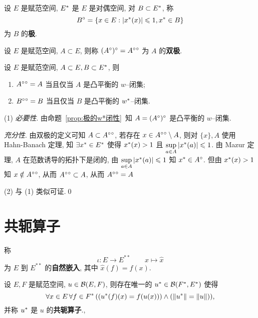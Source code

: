 	\begin{Definition}[对偶空间的极]\label{def:对偶空间的极}
		设 $ E $ 是赋范空间, $ E^{*} $ 是 $ E $ 是对偶空间, 对 $ B\subset E^{*} $, 称
		\[
			B^{\circ}=\{ x\in E:\left| x^{*}(x) \right| \leqslant1, x^{*}\in B \}
		\]
		为 $ B $ 的\textbf{极}.
	\end{Definition}
	\begin{Definition}[双极]\label{def:双极}
		设 $ E $ 是赋范空间, $ A\subset E $, 则称 $ (A^{\circ})^{\circ}=A^{\circ}{}^{\circ} $ 为 $ A $ 的\textbf{双极}.
	\end{Definition}

	\begin{Theorem}[双极定理]\label{thm:双极定理}

		设 $ E $ 是赋范空间, $ A\subset E, B\subset E^{*} $, 则
		\begin{enumerate}[(1)]
			\item $ A^{\circ}{}^{\circ}=A $ 当且仅当 $ A $ 是凸平衡的 $ w $--闭集;
			\item $ B^{\circ}{}^{\circ}=B $ 当且仅当 $ B $ 是凸平衡的 $ w^{*} $--闭集.
		\end{enumerate}
	\end{Theorem}
	\begin{Proof}
		(1) \textsl{必要性}. 由命题~\ref{prop:极的w*闭性}~知 $ A=(A^{\circ})^{\circ} $ 是凸平衡的 $ w $--闭集.

		\textsl{充分性}. 由双极的定义可知 $ A\subset A^{\circ}{}^{\circ} $, 若存在 $ x\in A^{\circ}{}^{\circ}\setminus A $, 则对 $ \{ x \}, A $ 使用 Hahn-Banach 定理, 知 $ \exists x^{*}\in E^{*} $ 使得 $ x^{*}(x)>1 $ 且 $ \sup\limits_{a\in A}\left| x^{*}(a) \right| \leqslant1 $. 由 Mazur 定理, $ A $ 在范数诱导的拓扑下是闭的, 由 $ \sup\limits_{a\in A}\left| x^{*}(a) \right| \leqslant1 $ 知 $ x^{*}\in A^{\circ} $. 但由 $ x^{*}(x)>1 $ 知 $ x\notin A^{\circ}{}^{\circ} $, 从而 $ A^{\circ}{}^{\circ}\subset A $, 从而 $ A^{\circ}{}^{\circ}= A $

		(2) 与 (1) 类似可证.\qed
	\end{Proof}
\section{共轭算子}
	\begin{Definition}[自然嵌入]\label{def:自然嵌入}
		称
		\[
			\iota: E\to E^{**}\qquad x\mapsto \hat{x}
		\]
		为 $ E $ 到 $ E^{**} $ 的\textbf{自然嵌入}, 其中 $ \hat{x}(f)=f(x) $.
	\end{Definition}
	\begin{Theorem}
		设 $ E, F $ 是赋范空间, $ u\in\mathcal{B}(E, F) $, 则存在唯一的 $ u^{*}\in\mathcal{B}(F^{*}, E^{*}) $ 使得
		\[
			\forall x\in E\,\forall f\in F^{*}\,((u^{*}(f)(x)=f(u(x)))\land (\left\| u^{*} \right\|=\left\| u \right\|)),
		\]
		并称 $ u^{*} $ 是 $ u $ 的\textbf{共轭算子}.,
	\end{Theorem}

